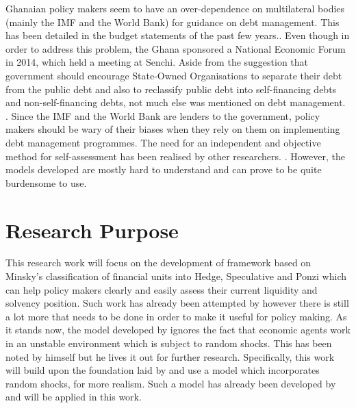 \documentclass[a4paper, 12pt]{article}
\begin{document}
	Ghanaian policy makers seem to have an over-dependence on multilateral bodies (mainly the IMF and the World Bank) for guidance on debt management. This has been detailed in the budget statements of the past few years.\cite{Ken2017,Ken2017nov,Terkper2015}. Even though in order to address this problem, the Ghana sponsored a National Economic Forum in 2014, which held a meeting at Senchi. Aside from the suggestion that government should encourage State-Owned Organisations to separate their debt from the public debt and also to reclassify public debt into self-financing debts and non-self-financing debts, not much else was mentioned on debt management. \cite{NEF2014}. Since the IMF and the World Bank are lenders to the government, policy makers should be wary of their biases when they rely on them on implementing debt management programmes. The need for an independent and objective method for self-assessment has been realised by other researchers. \cite{Ana-Mari-2007, Marc-2008}. However, the models developed are mostly hard to understand and can prove to be quite burdensome to use.
	
	
	\section{Research Purpose}
	This research work will focus on the development of framework based on Minsky's classification of financial units into Hedge, Speculative and Ponzi which can help policy makers clearly and easily assess their current liquidity and solvency position. Such work has already been attempted by  however there is still a lot more that needs to be done in order to make it useful for policy making. As it stands now, the model developed by  ignores the fact that economic agents work in an unstable environment which is subject to random shocks. This has been noted by   himself but he lives it out for further research. Specifically, this work will build upon the foundation laid by  and use a model which incorporates random shocks, for more realism. Such a model has already been developed by  and will be applied in this work.
	
\end{document}
